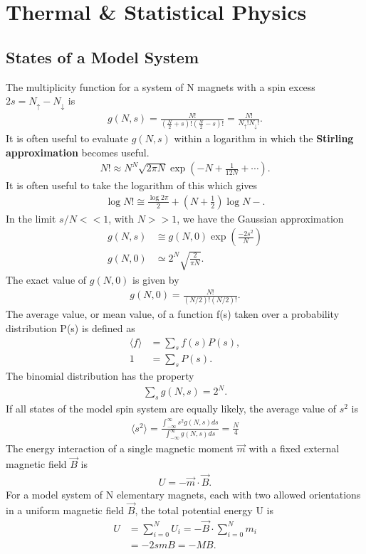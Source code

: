 \chapter{Thermal \& Statistical Physics}
\thispagestyle{fancy}

\begin{multicols}{2}
	\section{States of a Model System}
	The multiplicity function for a system of N magnets with a spin excess $2s=	N_{\uparrow}-N_{\downarrow}$ is
	\begin{align}
		g(N,s)=\frac{N!}{(\frac{N}{2}+s)!(\frac{N}{2}-s)!} = \frac{N!}{N_{\uparrow}!N_{\downarrow}!}.
	\end{align}
	It is often useful to evaluate $g(N,s)$ within a logarithm in which the \textbf{Stirling approximation} becomes useful.
	\begin{align}
		N! \approx N^N\sqrt{2\pi N} \exp\left(-N+\frac{1}{12N}+\cdots\right).
	\end{align}
	It is often useful to take the logarithm of this which gives
	\begin{align}
		\log N!\cong \frac{\log 2\pi}{2}+\left(N+\frac{1}{2}\right)
		\log N-.
	\end{align}
	In the limit $s/N << 1$, with $N>>1$, we have the Gaussian approximation 
	\begin{align}
		g(N,s) &\cong g(N,0)\exp\left(\frac{-2s^2}{N}\right) \\
		g(N,0)&\simeq 2^N\sqrt{\frac{2}{\pi N}}.
	\end{align}
	The exact value of $g(N,0)$ is given by
	\begin{align}
		g(N,0) = \frac{N!}{(N/2)!(N/2)!}.
	\end{align}
	The average value, or mean value, of a function f(s) taken over a probability distribution P(s) is defined as
	\begin{align}
		\langle f \rangle &=\sum_{s} f(s)P(s), \\
		1 &= \sum_{s} P(s).
	\end{align}
	The binomial distribution has the property 
	\begin{align}
		\sum_{s}g(N,s)=2^N.
	\end{align}
	If all states of the model spin system are equally likely, the average value of $s^2$ is
	\begin{align}
		\langle s^2 \rangle = \frac{\int_{-\infty}^{\infty}s^2 g(N,s) ds }{\int_{-\infty}^{\infty} g(N,s) ds } = \frac{N}{4}
	\end{align}
	The energy interaction of a single magnetic moment $\vec{m}$ with a fixed external magnetic field $\vec{B}$ is
	\begin{align}
		U=-\vec{m}\cdot \vec{B}.
	\end{align}
	For a model system of N elementary magnets, each with two allowed orientations in a uniform magnetic field $\vec{B}$, the total potential energy U is
	\begin{align}
		U &=\sum_{i=0}^{N}U_i=-\vec{B}\cdot \sum_{i=0}^{N}m_i \\
		&=-2smB = -MB.
	\end{align}

\end{multicols}
